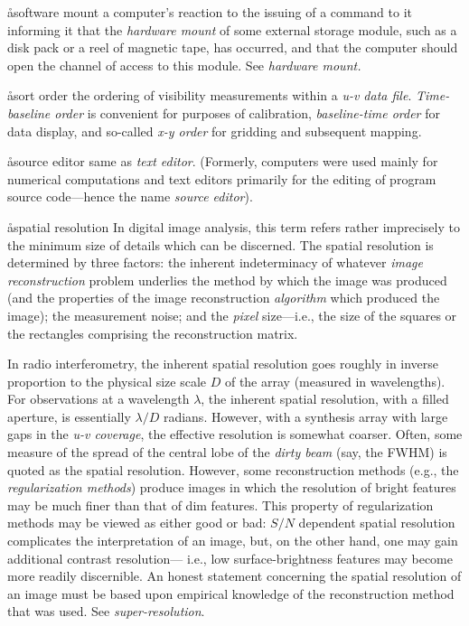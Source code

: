 
\aa{software mount}
a computer's reaction to
the issuing of a command to it informing it that
the {\it hardware mount} of some external storage module,
such as a disk pack or a reel of magnetic tape,
has occurred, and that the computer should open the channel
of access to this module.
See {\it hardware mount.}

\aa{sort order}
the ordering of visibility measurements within a {\it u-v data file}.
{\it Time-baseline order} is convenient for purposes of calibration,
{\it baseline-time order} for data display,
and so-called {\it x-y order} for gridding and subsequent mapping.

\aa{source editor} same as {\it text editor}.
(Formerly, computers were used mainly for numerical
computations and text editors primarily for the editing
of program source code---hence the name {\it source editor}\/).

\aa{spatial resolution}
In digital image analysis, this term refers rather imprecisely
to the minimum size of details which can be discerned.
The spatial resolution is determined by three factors:
the inherent indeterminacy of whatever {\it image reconstruction}
problem underlies the method by which the image was produced
(and the properties of the image reconstruction
{\sl algorithm} which produced the image); the measurement noise;
and the {\it pixel} size---i.e., the size of the squares or
the rectangles comprising the reconstruction matrix.
\par
In radio interferometry, the inherent spatial resolution
goes roughly in inverse proportion to the physical size scale $D$ of the
array (measured in wavelengths).
For observations at a wavelength $\lambda$, the inherent
spatial resolution, with a filled aperture, is essentially
$\lambda/D$ radians.
However, with a synthesis array with large gaps
in the {\it u-v coverage}, the effective resolution is somewhat coarser.
Often, some measure of the spread of the central lobe of the {\it dirty beam}
(say, the FWHM) is quoted as the spatial resolution.
However, some reconstruction methods (e.g., the {\it regularization
methods}) produce images in which the resolution of bright features
may be much finer than that of dim features.
This property of regularization methods may be viewed as either
good or bad: $S/N$ dependent spatial resolution complicates
the interpretation of an image, but, on the other hand,
one may gain additional contrast resolution---%
i.e., low surface-brightness features may become more readily discernible.
An honest statement concerning the spatial resolution of an image must be based
upon empirical knowledge of the reconstruction method that was used.
See {\it super-resolution}.

